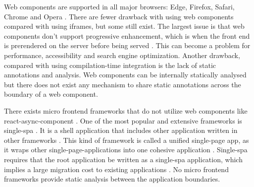 Web components are supported in all major browsers: Edge, Firefox, Safari, Chrome and Opera \cite{WebComponents.orga}. There are fewer drawback with using web components compared with using iframes, but some still exist. The largest issue is that web components don't support progressive enhancement, which is when the front end is prerendered on the server before being served \cite[ch.~5]{Geers2020}. This can become a problem for performance, accessibility and search engine optimization. Another drawback, compared with using compilation-time integration is the lack of static annotations and analysis. Web components can be internally statically analysed but there does not exist any mechanism to share static annotations across the boundary of a web component.

There exists micro frontend frameworks that do not utilize web components like react-async-component \cite{Matheson}. One of the most popular and extensive frameworks is single-spa \cite{Single-spa}. It is a shell application that includes other application written in other frameworks \cite{Single-spa}. This kind of framework is called a unified single-page app, as it wraps other single-page-applications into one cohesive application \cite{Geers2020}. Single-spa requires that the root application be written as a single-spa application, which implies a large migration cost to existing applications \cite{Single-spa}. No micro frontend frameworks provide static analysis between the application boundaries.


